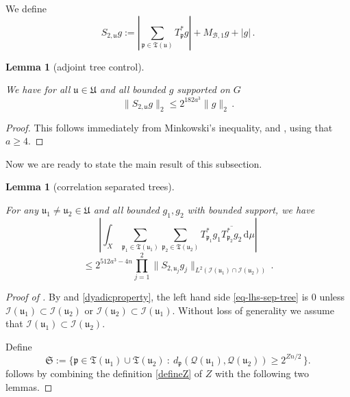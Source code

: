 \documentclass[10pt,a4paper]{article}
\theoremstyle{plain}
\newtheorem{lemma}[theorem]{Lemma}
\theoremstyle{definition}
\numberwithin{equation}{subsection}
\newcommand{\fp}{{\mathfrak p}}
\newcommand{\fu}{{\mathfrak u}}
\newcommand{\fU}{{\mathfrak U}}
\newcommand{\fT}{{\mathfrak T}}
\newcommand{\scI}{{\mathcal{I}}} %
\newcommand{\fcc}{{\mathcal{Q}}}
\newcommand{\lean}[1]{}
\newcommand{\proves}[1]{}
\newcommand{\uses}[1]{}
\newcommand{\leanok}{}
\begin{document}
We define
$$
    S_{2,\fu}g := \left|\sum_{\fp \in \fT(\fu)} T_{\fp}^*g \right| + M_{\mathcal{B},1}g + |g|\,.
$$
\begin{lemma}[adjoint tree control]
    \label{adjoint-tree-control}
    \leanok
    \lean{TileStructure.Forest.adjoint_tree_control}
    \uses{adjoint-tree-estimate}
    We have for all $\fu \in \fU$ and all bounded $g$ supported on $G$
    $$
        \|S_{2, \fu} g\|_2 \le 2^{182a^3} \|g\|_2\,.
    $$
\end{lemma}

\begin{proof}
    \leanok
    This follows immediately from Minkowski's inequality,  and , using that $a \ge 4$.
\end{proof}


Now we are ready to state the main result of this subsection.

\begin{lemma}[correlation separated trees]
    \label{correlation-separated-trees}
    \leanok
    \lean{TileStructure.Forest.correlation_separated_trees}
    \uses{correlation-distant-tree-parts,correlation-near-tree-parts}
    For any $\fu_1 \ne \fu_2 \in \fU$ and all bounded $g_1, g_2$ with bounded support, we have
    \begin{equation}
        \label{eq-lhs-sep-tree}
        \left| \int_X \sum_{\fp_1 \in \fT(\fu_1)} \sum_{\fp_2 \in \fT(\fu_2)} T^*_{\fp_1}g_1 \overline{T^*_{\fp_2}g_2 }\,\mathrm{d}\mu \right|
    \end{equation}
    \begin{equation}
        \label{eq-rhs-sep-tree}
        \le 2^{512a^3-4n} \prod_{j =1}^2 \| S_{2, \fu_j} g_j\|_{L^2(\scI(\fu_1) \cap \scI(\fu_2))}\,.
    \end{equation}
\end{lemma}

\begin{proof}[Proof of ]
    \leanok
    \proves{correlation-separated-trees}
    By  and \eqref{dyadicproperty}, the left hand side \eqref{eq-lhs-sep-tree} is $0$ unless $\scI(\fu_1) \subset \scI(\fu_2)$ or $\scI(\fu_2) \subset \scI(\fu_1)$. Without loss of generality we assume that $\scI(\fu_1) \subset \scI(\fu_2)$.

    Define
    \begin{equation}
        \label{def-Tree-S-set}
         \mathfrak{S} := \{\fp \in \fT(\fu_1) \cup \fT(\fu_2) \ : \ d_{\fp}(\fcc(\fu_1), \fcc(\fu_2)) \ge 2^{Zn/2}\,\}.
    \end{equation}
     follows by combining the definition \eqref{defineZ} of $Z$ with the following two lemmas.
\end{proof}
\end{document}
